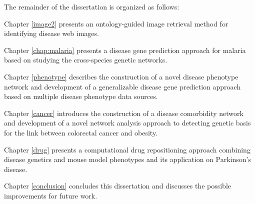 The remainder of the dissertation is organized as follows:

Chapter \ref{image2} presents an ontology-guided image retrieval method for identifying disease web images.

Chapter \ref{chap:malaria} presents a disease gene prediction approach for malaria based on studying the cross-species genetic networks.

Chapter \ref{phenotype} describes the construction of a novel disease phenotype network and development of a generalizable disease gene prediction approach based on multiple disease phenotype data sources.

Chapter \ref{cancer} introduces the construction of a disease comorbidity network and development of a novel network analysis approach to detecting genetic basis for the link between colorectal cancer and obesity.

Chapter \ref{drug} presents a computational drug repositioning approach combining disease genetics and mouse model phenotypes and its application on Parkinson's disease.

Chapter \ref{conclusion} concludes this dissertation and discusses the possible improvements
for future work.




